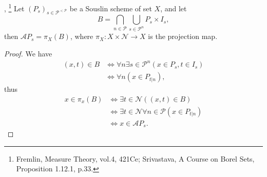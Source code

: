 \begin{lemma} \label{L:souslin_proj},
  \footnote{Fremlin, Measure Theory, vol.4, 421Ce;
    Srivastava, A Course on Borel Sets, Proposition 1.12.1, p.33.}
Let $(P_s)_{s\in\mathcal{P}^{<\mathcal{P}}}$ be a Souslin scheme of set $X$, 
and let
\[
  B = \bigcap_{n\in\mathcal{P}} \bigcup_{s\in\mathcal{P}^n}
      P_s \times I_s,
\]
then $\mathcal{A} P_s = \pi_X(B)$, where $\pi_X: X\times\mathcal{N}\to X$ is the
projection map.
\end{lemma}
\begin{proof}
We have
\begin{align*}
  (x,t)\in B 
    & \iff \forall n \exists s\in\mathcal{P}^n (x\in P_s, t\in I_s) \\
    & \iff \forall n (x\in P_{t|n}),
\end{align*}
thus
\begin{align*}
  x\in \pi_x(B)
	& \iff \exists t\in\mathcal{N} ((x,t)\in B) \\
	& \iff \exists t\in\mathcal{N} \forall n\in\mathcal{P} (x\in P_{t|n}) \\
	& \iff x\in \mathcal{A} P_s.
\end{align*}
  
\end{proof}

